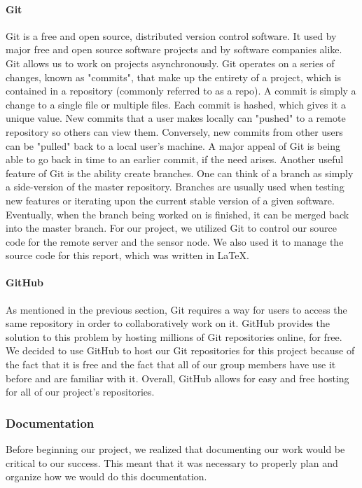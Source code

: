 \paragraph{Git}
Git is a free and open source, distributed version control software. It used by major free and open source software projects and by software companies alike. Git allows us to work on projects asynchronously. Git operates on a series of changes, known as "commits", that make up the entirety of a project, which is contained in a repository (commonly referred to as a repo). A commit is simply a change to a single file or multiple files. Each commit is hashed, which gives it a unique value. New commits that a user makes locally can "pushed" to a remote repository so others can view them. Conversely, new commits from other users can be "pulled" back to a local user's machine. A major appeal of Git is being able to go back in time to an earlier commit, if the need arises. Another useful feature of Git is the ability create branches. One can think of a branch as simply a side-version of the master repository. Branches are usually used when testing new features or iterating upon the current stable version of a given software. Eventually, when the branch being worked on is finished, it can be merged back into the master branch. For our project, we utilized Git to control our source code for the remote server and the sensor node. We also used it to manage the source code for this report, which was written in LaTeX.

\paragraph{GitHub}
As mentioned in the previous section, Git requires a way for users to access the same repository in order to collaboratively work on it. GitHub provides the solution to this problem by hosting millions of Git repositories online, for free. We decided to use GitHub to host our Git repositories for this project because of the fact that it is free and the fact that all of our group members have use it before and are familiar with it. Overall, GitHub allows for easy and free hosting for all of our project's repositories.

\subsubsection{Documentation}
Before beginning our project, we realized that documenting our work would be critical to our success. This meant that it was necessary to properly plan and organize how we would do this documentation.

